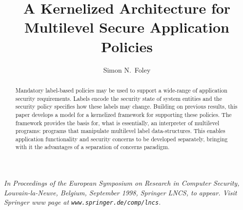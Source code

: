 \documentclass{../../tex/llncs}
\begin{document}
\newcommand{\s}[1]	 {\mbox{\tt #1}}               %
\newtheorem{aex}{Example}
\newenvironment{ex}{\begin{aex}\rm}{\hfill$\triangle$\end{aex}}

\newcommand{\unclass}{\s{u}}
\newcommand{\secret}{\s{s}}
\newcommand{\topsec}{\s{t}}


\newcommand{\fleq}{\leq}
\newcommand{\ftop}{\top}
\newcommand{\fneq}{|}
\newcommand{\isat}{\sim}
\newcommand{\lproj}{\project}
\newcommand{\Rfun}{\mbox{$\cal F_{R}$}}
\newcommand{\LEVEL}{C}
\newcommand{\LABEL}{L}
\newcommand{\FID}{F}
\newcommand{\Invisible}{\mbox{\tt Invisible}}
\newcommand{\Object}{\mbox{\tt Obj}}
\newcommand{\Proxy}{\mbox{\tt Prxy}}
\newcommand{\lo}{\mbox{\tt Lo}}
\newcommand{\hi}{\mbox{\tt Hi}}
\newcommand{\mlo}{\mbox{\tt Mlo}}
\newcommand{\invis}{\mbox{\tt Invisible}}
\newcommand{\deltaz}{\delta_0}

\newcommand{\lev}{\gamma}



\title{A Kernelized Architecture for Multilevel Secure Application Policies
} 

\author{Simon N.~Foley\fnmsep{}}

\maketitle


\begin{abstract}
Mandatory label-based policies may be used to support a wide-range of
application security requirements.  Labels encode the security state of
system entities and the security policy specifies how these labels may
change.  Building on previous results, this paper develops a 
model for a kernelized framework for supporting these policies.  
The framework provides the
basis for, what is essentially,  an interpreter of multilevel programs:
programs that manipulate multilevel label data-structures.  This
enables application functionality and security concerns to be developed
separately, bringing with it the advantages of a separation of concerns
paradigm.
\end{abstract}



{\it In Proceedings of the European
Symposium on Research in Computer Security, Louvain-la-Neuve, Belgium,
September 1998, Springer LNCS, to appear.
Visit Springer www page at 
\verb#www.springer.de/comp/lncs#. 
}


\eject

\eject


\eject


\eject


 \eject


\eject
\end{document}
